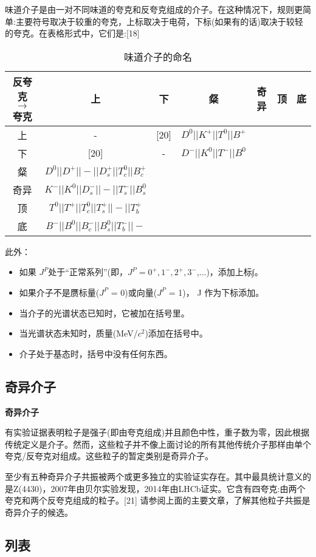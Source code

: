 味道介子是由一对不同味道的夸克和反夸克组成的介子。在这种情况下，规则更简单:主要符号取决于较重的夸克，上标取决于电荷，下标(如果有的话)取决于较轻的夸克。在表格形式中，它们是:[18]
\begin{table}[ht]
\centering
\caption{味道介子的命名}\label{tab_JZ4}
\begin{tabular}{|c|c|c|c|c|c|c|}
\hline
反夸克 $\to$ 夸克 & 上& 下 & 粲 &奇异 & 顶 & 底 \\
\hline
上 & - & [20] &$ D^0 || K^+ || T^0 || B^+$  \\
\hline
下& [20]  & - & $D^- || K^0 || T^- || B^0 $ \\
\hline
粲&$ D^0 || D^+ || - || D^+_s || T^0_c || B^+_c $\\
\hline
奇异& $K^- || K^0 || D^-_s || - || T^-_s || B^0_s $ \\
\hline
顶& $T^0 || T^+ || T^0_c || T^+_s || - ||T^+_b $\\
\hline
底& $B^- || B^0 || B^-_c || B^0_s || T^-_b || -$  \\
\hline
\end{tabular}
\end{table}
此外：\begin{itemize}
\item 如果 $J^P $处于“正常系列”(即，$ J^P =0^+,1^-,2^+,3^-$,...)，添加上标∫。
\item 如果介子不是赝标量($J^P $ = 0)或向量($J^P $ = 1)， J 作为下标添加。
\item 当介子的光谱状态已知时，它被加在括号里。
\item 当光谱状态未知时，质量(MeV/$c^2$)添加在括号中。
\item 介子处于基态时，括号中没有任何东西。
\end{itemize}
\subsection{奇异介子}
\textbf{奇异介子}

有实验证据表明粒子是强子(即由夸克组成)并且颜色中性，重子数为零，因此根据传统定义是介子。然而，这些粒子并不像上面讨论的所有其他传统介子那样由单个夸克/反夸克对组成。这些粒子的暂定类别是奇异介子。

至少有五种奇异介子共振被两个或更多独立的实验证实存在。其中最具统计意义的是Z(4430)，2007年由贝尔实验发现，2014年由LHCb证实。它含有四夸克:由两个夸克和两个反夸克组成的粒子。[21] 请参阅上面的主要文章，了解其他粒子共振是奇异介子的候选。
\subsection{列表}
